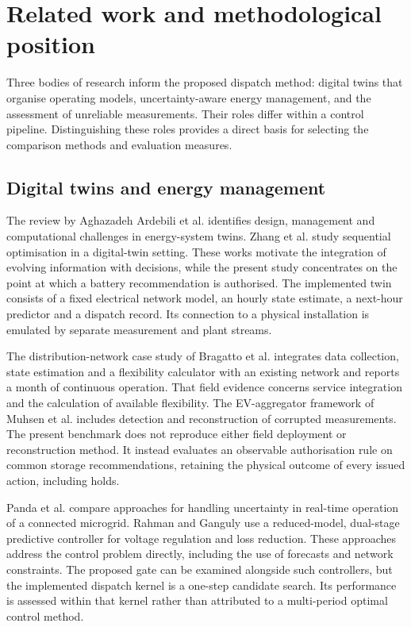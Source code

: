 \documentclass[preprint,12pt]{elsarticle}
\begin{document}
\section{Related work and methodological position}\label{sec:related}
Three bodies of research inform the proposed dispatch method: digital twins that organise operating models, uncertainty-aware energy management, and the assessment of unreliable measurements. Their roles differ within a control pipeline. Distinguishing these roles provides a direct basis for selecting the comparison methods and evaluation measures.

\subsection{Digital twins and energy management}
The review by Aghazadeh Ardebili et al. \cite{ardebili} identifies design, management and computational challenges in energy-system twins. Zhang et al. \cite{zhang} study sequential optimisation in a digital-twin setting. These works motivate the integration of evolving information with decisions, while the present study concentrates on the point at which a battery recommendation is authorised. The implemented twin consists of a fixed electrical network model, an hourly state estimate, a next-hour predictor and a dispatch record. Its connection to a physical installation is emulated by separate measurement and plant streams.

The distribution-network case study of Bragatto et al. \cite{bragatto} integrates data collection, state estimation and a flexibility calculator with an existing network and reports a month of continuous operation. That field evidence concerns service integration and the calculation of available flexibility. The EV-aggregator framework of Muhsen et al. \cite{muhsen} includes detection and reconstruction of corrupted measurements. The present benchmark does not reproduce either field deployment or reconstruction method. It instead evaluates an observable authorisation rule on common storage recommendations, retaining the physical outcome of every issued action, including holds.


Panda et al. \cite{panda} compare approaches for handling uncertainty in real-time operation of a connected microgrid. Rahman and Ganguly \cite{rahman} use a reduced-model, dual-stage predictive controller for voltage regulation and loss reduction. These approaches address the control problem directly, including the use of forecasts and network constraints. The proposed gate can be examined alongside such controllers, but the implemented dispatch kernel is a one-step candidate search. Its performance is assessed within that kernel rather than attributed to a multi-period optimal control method.
\end{document}

